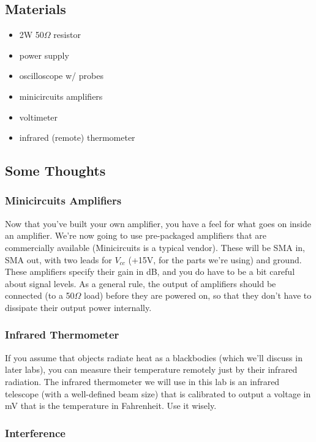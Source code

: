\documentclass[11pt]{article}
\begin{document}
\subsection*{Materials}

\begin{itemize}
\item 2W 50$\Omega$ resistor
\item power supply
\item oscilloscope w/ probes
\item minicircuits amplifiers
\item voltimeter
\item infrared (remote) thermometer
\end{itemize}

\subsection*{Some Thoughts}

\subsubsection*{Minicircuits Amplifiers}

Now that you've built your own amplifier, you have a feel for what goes on inside an amplifier.  We're
now going to use pre-packaged amplifiers that are commercially available (Minicircuits is a typical vendor).
These will be SMA in, SMA out, with two leads for $V_{cc}$ (+15V, for the parts we're using) and ground.
These amplifiers specify their gain in dB, and you do have to be a bit careful about signal levels.
As a general rule, the output of amplifiers should be connected (to a 50$\Omega$ load) before they are
powered on, so that they don't have to dissipate their output power internally.

\subsubsection*{Infrared Thermometer}

If you assume that objects radiate heat as a blackbodies (which we'll discuss in later labs), you
can measure their temperature remotely just by their infrared radiation.  The infrared thermometer
we will use in this lab is an infrared telescope (with a well-defined beam size) that is
calibrated to output a voltage in mV that is the temperature in Fahrenheit.  Use it wisely.

\subsubsection*{Interference}
\end{document}
